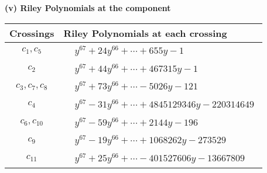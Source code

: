 \documentclass[1p]{elsarticle_modified}
\theoremstyle{definition}
\begin{document}
\flushleft \textbf{(v) Riley Polynomials at the component}\newline \\
\begin{tabular}{m{50pt}|m{274pt}}
Crossings & \hspace{64pt}Riley Polynomials at each crossing \\
\hline $$\begin{aligned}c_{1},c_{5}\end{aligned}$$&$\begin{aligned}
&y^{67}+24 y^{66}+\cdots+655 y-1
\end{aligned}$\\
\hline $$\begin{aligned}c_{2}\end{aligned}$$&$\begin{aligned}
&y^{67}+44 y^{66}+\cdots+467315 y-1
\end{aligned}$\\
\hline $$\begin{aligned}c_{3},c_{7},c_{8}\end{aligned}$$&$\begin{aligned}
&y^{67}+73 y^{66}+\cdots-5026 y-121
\end{aligned}$\\
\hline $$\begin{aligned}c_{4}\end{aligned}$$&$\begin{aligned}
&y^{67}-31 y^{66}+\cdots+4845129346 y-220314649
\end{aligned}$\\
\hline $$\begin{aligned}c_{6},c_{10}\end{aligned}$$&$\begin{aligned}
&y^{67}-59 y^{66}+\cdots+2144 y-196
\end{aligned}$\\
\hline $$\begin{aligned}c_{9}\end{aligned}$$&$\begin{aligned}
&y^{67}-19 y^{66}+\cdots+1068262 y-273529
\end{aligned}$\\
\hline $$\begin{aligned}c_{11}\end{aligned}$$&$\begin{aligned}
&y^{67}+25 y^{66}+\cdots-401527606 y-13667809
\end{aligned}$\\
\hline
\end{tabular}\\~\\
\end{document}
